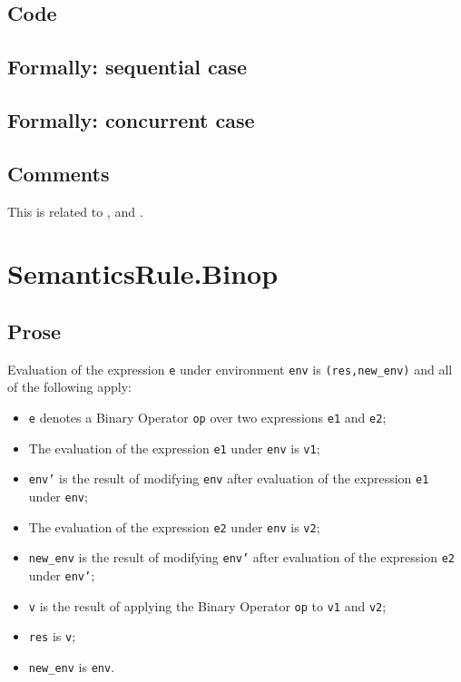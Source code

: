 \documentclass{book}
\begin{document}
  \subsection{Code}
\begin{emptyformal}
  \subsection{Formally: sequential case}

  \subsection{Formally: concurrent case}
\end{emptyformal}

\subsection{Comments}
  This is related to , and .

\section{SemanticsRule.Binop \label{sec:SemanticsRule.Binop}}

  \subsection{Prose}
Evaluation of the expression \texttt{e} under environment \texttt{env} is \texttt{(res,new\_env)} and all of the following apply:
  \begin{itemize}
  \item \texttt{e} denotes a Binary Operator \texttt{op} over two expressions \texttt{e1} and \texttt{e2};
  \item The evaluation of the expression \texttt{e1} under \texttt{env} is \texttt{v1};
  \item \texttt{env'} is the result of modifying \texttt{env} after evaluation of the expression \texttt{e1} under \texttt{env};
  \item The evaluation of the expression \texttt{e2} under \texttt{env} is \texttt{v2};
  \item \texttt{new\_env} is the result of modifying \texttt{env'} after evaluation of the expression \texttt{e2} under \texttt{env'};
  \item \texttt{v} is the result of applying the Binary Operator \texttt{op} to \texttt{v1} and \texttt{v2};
  \item \texttt{res} is \texttt{v};
  \item \texttt{new\_env} is \texttt{env}.
  \end{itemize}
\end{document}
